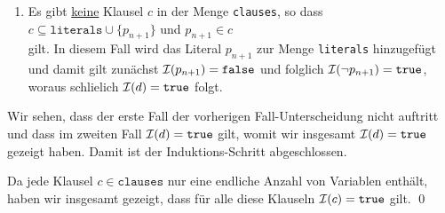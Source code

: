 \begin{enumerate}
\begin{enumerate}
\begin{enumerate}
                         Hilfe der Schnitt-Regel aus den beiden Klauseln
                         \\[0.2cm]
                         \hspace*{1.3cm}
                         $c = c' \cup \{p_{n+1}\}$, \quad $d = d' \cup \{ \neg p_{n+1} \}$, 
                         \\[0.2cm]
                         gefolgert werden kann.  Das hei\3t dann aber, dass die Klausel $c' \cup d'$ ein
                         Element der Menge \texttt{clauses} sein muss, denn die Menge
                         \texttt{clauses} ist ja saturiert!  Da die Klausel $c' \cup d'$ au\3erdem
                         nur die aussagenlogischen Variablen $p_1, \cdots, p_n$ enth\"{a}lt, gilt nach
                         Induktions-Voraussetzung 
                         \\[0.2cm]
                         \hspace*{1.3cm}
                         $\I(c' \cup d') = \mathtt{true}$.
                         \\[0.2cm]
                         Dies steht im Widerspruch zu $(*)$.  Dieser Widerspruch zeigt, dass 
                         es keine Klausel $c \in \mathtt{clauses}$ mit 
                         \\[0.2cm]
                         \hspace*{1.3cm}
                         $c \subseteq \mathtt{literals} \cup \{p_{n+1}\}$ \quad und \quad $p_{n+1} \in c$
                         \\[0.2cm]
                         geben kann und damit tritt der hier untersuchte Fall gar nicht auf. $\lightning$
                   \item Es gibt \underline{keine} Klausel $c$ in der Menge \texttt{clauses}, so dass
                         \\[0.2cm]
                         \hspace*{1.3cm}
                         $c \subseteq \mathtt{literals} \cup \{p_{n+1}\}$ \quad und \quad $p_{n+1} \in c$
                         \\[0.2cm]
                         gilt.  In diesem Fall wird das Literal $p_{n+1}$ zur Menge \texttt{literals}
                         hinzugef\"{u}gt und damit gilt zun\"{a}chst $\mathcal{I}(p_{n+1}) = \mathtt{false}$ und folglich
                         $\mathcal{I}(\neg p_{n+1}) = \mathtt{true}$, woraus schlie\3lich $\mathcal{I}(d) = \mathtt{true}$ folgt.
                   \end{enumerate}
                   Wir sehen, dass der erste Fall der vorherigen Fall-Unterscheidung nicht
                   auftritt und dass im zweiten Fall $\mathcal{I}(d) = \mathtt{true}$ gilt, womit wir insgesamt 
                   $\mathcal{I}(d) = \mathtt{true}$ gezeigt haben.  Damit ist der Induktions-Schritt
                   abgeschlossen.
             \end{enumerate}
             Da jede Klausel $c \in \mathtt{clauses}$ nur eine endliche Anzahl von Variablen
             enth\"{a}lt, haben wir insgesamt gezeigt, dass f\"{u}r alle diese Klauseln 
             $\mathcal{I}(c) = \mathtt{true}$ gilt. \qed
\end{enumerate}

